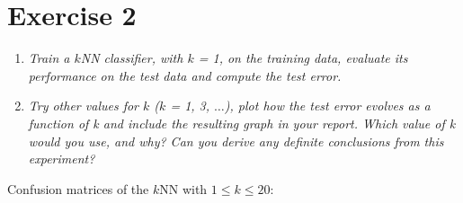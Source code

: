 \documentclass[a4paper,11pt]{article}
\begin{document}


\section*{Exercise 2}
\begin{enumerate}
\item \textit{Train a $k$NN classifier, with $k$ = 1, on the training data, evaluate its performance on the test data and
compute the test error.}
\item \textit{Try other values for $k$ ($k$ = 1, 3, $\ldots$), plot how the test error evolves as a function of k and include the
resulting graph in your report. Which value of k would you use, and why? Can you derive any definite
conclusions from this experiment?
}


\end{enumerate}

\label{sec:two}
Confusion matrices of the $k$NN with $1 \leq k \leq 20$:
\end{document}
